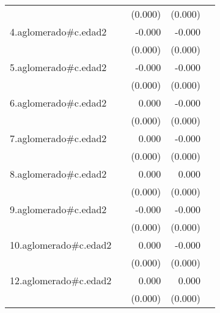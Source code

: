 {\begin{longtable}{l*{4}{D{.}{.}{-1}}}
            &                     &     (0.000)         &     (0.000)         &                     \\
\addlinespace
4.aglomerado#c.edad2&                     &      -0.000         &      -0.000\sym{***}&                     \\
            &                     &     (0.000)         &     (0.000)         &                     \\
\addlinespace
5.aglomerado#c.edad2&                     &      -0.000         &      -0.000         &                     \\
            &                     &     (0.000)         &     (0.000)         &                     \\
\addlinespace
6.aglomerado#c.edad2&                     &       0.000         &      -0.000         &                     \\
            &                     &     (0.000)         &     (0.000)         &                     \\
\addlinespace
7.aglomerado#c.edad2&                     &       0.000         &      -0.000\sym{*}  &                     \\
            &                     &     (0.000)         &     (0.000)         &                     \\
\addlinespace
8.aglomerado#c.edad2&                     &       0.000         &       0.000         &                     \\
            &                     &     (0.000)         &     (0.000)         &                     \\
\addlinespace
9.aglomerado#c.edad2&                     &      -0.000\sym{*}  &      -0.000\sym{***}&                     \\
            &                     &     (0.000)         &     (0.000)         &                     \\
\addlinespace
10.aglomerado#c.edad2&                     &       0.000         &      -0.000         &                     \\
            &                     &     (0.000)         &     (0.000)         &                     \\
\addlinespace
12.aglomerado#c.edad2&                     &       0.000\sym{**} &       0.000\sym{*}  &                     \\
            &                     &     (0.000)         &     (0.000)         &                     \\

\end{longtable}}
